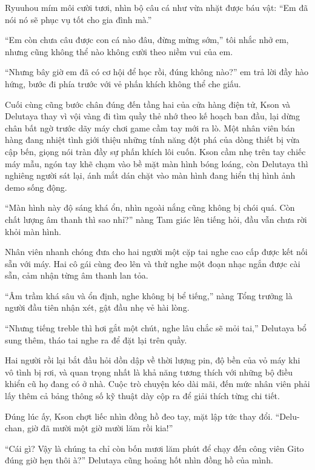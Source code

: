 ﻿\documentclass[../main.tex]{subfiles}
\begin{document}
Ryuuhou mím môi cười tươi, nhìn bộ câu cá như vừa nhặt được báu vật: ``Em đã nói nó sẽ phục vụ tốt cho gia đình mà.''

``Em còn chưa câu được con cá nào đâu, đừng mừng sớm,'' tôi nhắc nhở em, nhưng cũng không thể nào không cười theo niềm vui của em.

``Nhưng bây giờ em đã có cơ hội để học rồi, đúng không nào?'' em trả lời đầy hào hứng, bước đi phía trước với vẻ phấn khích không thể che giấu.

\ct

\pov{-}

Cuối cùng cũng bước chân đúng đến tầng hai của cửa hàng điện tử, Kson và Delutaya thay vì vội vàng đi tìm quầy thẻ nhớ theo kế hoạch ban đầu, lại dừng chân bất ngờ trước dãy máy chơi game cầm tay mới ra lò. Một nhân viên bán hàng đang nhiệt tình giới thiệu những tính năng đột phá của dòng thiết bị vừa cập bến, giọng nói tràn đầy sự phấn khích lôi cuốn. Kson cầm nhẹ trên tay chiếc máy mẫu, ngón tay khẽ chạm vào bề mặt màn hình bóng loáng, còn Delutaya thì nghiêng người sát lại, ánh mắt dán chặt vào màn hình đang hiển thị hình ảnh demo sống động.

``Màn hình này độ sáng khá ổn, nhìn ngoài nắng cũng không bị chói quá. Còn chất lượng âm thanh thì sao nhỉ?'' nàng Tam giác lên tiếng hỏi, đầu vẫn chưa rời khỏi màn hình.

Nhân viên nhanh chóng đưa cho hai người một cặp tai nghe cao cấp được kết nối sẵn với máy. Hai cô gái cùng đeo lên và thử nghe một đoạn nhạc ngắn được cài sẵn, cảm nhận từng âm thanh lan tỏa.

``Âm trầm khá sâu và ổn định, nghe không bị bể tiếng,'' nàng Tổng trưởng là người đầu tiên nhận xét, gật đầu nhẹ vẻ hài lòng.

``Nhưng tiếng treble thì hơi gắt một chút, nghe lâu chắc sẽ mỏi tai,'' Delutaya bổ sung thêm, tháo tai nghe ra để đặt lại trên quầy.

Hai người rồi lại bắt đầu hỏi dồn dập về thời lượng pin, độ bền của vỏ máy khi vô tình bị rơi, và quan trọng nhất là khả năng tương thích với những bộ điều khiển cũ họ đang có ở nhà. Cuộc trò chuyện kéo dài mãi, đến mức nhân viên phải lấy thêm cả bảng thông số kỹ thuật dày cộp ra để giải thích từng chi tiết.

Đúng lúc ấy, Kson chợt liếc nhìn đồng hồ đeo tay, mặt lập tức thay đổi. ``Delu-chan, giờ đã mười một giờ mười lăm rồi kia!''

``Cái gì? Vậy là chúng ta chỉ còn bốn mươi lăm phút để chạy đến công viên Gito đúng giờ hẹn thôi à?'' Delutaya cũng hoảng hốt nhìn đồng hồ của mình.
\end{document}
